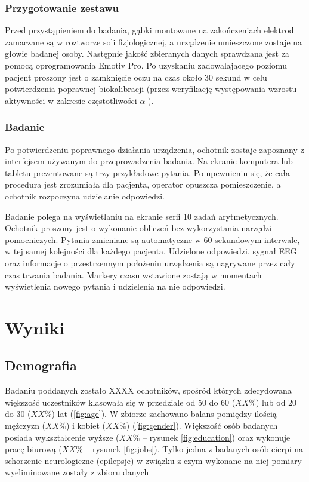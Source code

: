\documentclass{./assets/wfis}
\begin{document}
\subsection{Przygotowanie zestawu}
Przed przystąpieniem do badania, gąbki montowane na zakończeniach elektrod zamaczane są w roztworze soli fizjologicznej, a urządzenie umieszczone zostaje na głowie badanej osoby. Następnie jakość zbieranych danych sprawdzana jest za pomocą oprogramowania Emotiv Pro\cite{emotiv_inc_epoc_nodate}. Po uzyskaniu zadowalającego poziomu pacjent proszony jest o zamknięcie oczu na czas około 30 sekund w celu potwierdzenia poprawnej biokalibracji (przez weryfikację występowania wzrostu aktywności w zakresie częstotliwości $\alpha$ \cite{britton_electroencephalography_2016}).

\subsection{Badanie}
Po potwierdzeniu poprawnego działania urządzenia, ochotnik zostaje zapoznany z interfejsem używanym do przeprowadzenia badania. Na ekranie komputera lub tabletu prezentowane są trzy przykładowe pytania. Po upewnieniu się, że cała procedura jest zrozumiała dla pacjenta, operator opuszcza pomieszczenie, a ochotnik rozpoczyna udzielanie odpowiedzi.

Badanie polega na wyświetlaniu na ekranie  serii 10 zadań arytmetycznych. Ochotnik proszony jest o wykonanie obliczeń bez wykorzystania narzędzi pomocniczych. Pytania zmieniane są automatyczne w 60-sekundowym interwale, w tej samej kolejności dla każdego pacjenta. Udzielone odpowiedzi, sygnał EEG oraz informacje o przestrzennym położeniu urządzenia są nagrywane przez cały czas trwania badania. Markery czasu wstawione zostają w momentach wyświetlenia nowego pytania i udzielenia na nie odpowiedzi.


\chapter{Wyniki}
\section{Demografia}
Badaniu poddanych zostało XXXX ochotników, spośród których zdecydowana większość uczestników klasowała się w przedziale od 50 do 60 ($XX\%$) lub od 20 do 30 ($XX\%$) lat (\autoref{fig:age}). W zbiorze zachowano balans pomiędzy ilością mężczyzn ($XX\%$) i kobiet ($XX\%$) (\autoref{fig:gender}). Większość osób badanych posiada wykształcenie wyższe ($XX\%$ – rysunek \ref{fig:education}) oraz wykonuje pracę biurową ($XX\%$ – rysunek \ref{fig:jobs}). Tylko jedna z badanych osób cierpi na schorzenie neurologiczne (epilepsje) w związku z czym wykonane na niej pomiary  wyeliminowane zostały z zbioru danych
\end{document}
